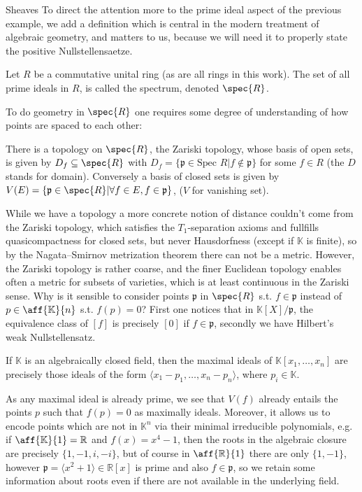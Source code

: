\begin{section}{Sheaves}
To direct the attention more to the prime ideal aspect of the previous example, 
we add a definition which is central in the modern treatment of algebraic geometry,
and matters to us, because we will need it to properly state the positive Nullstellensaetze.

\begin{definition}
   Let \( R \) be a commutative unital ring (as are all rings in this work).
   The set of all prime ideals in \( R \), is called the spectrum, denoted \( \spec{R} \).
\end{definition}

To do geometry in \( \spec{R} \) one requires some degree of understanding of how points are spaced to each other:
\begin{definition}
    There is a topology on \( \spec{R} \), the Zariski topology, whose basis of open sets,
    is given by \( D_f \subseteq \spec{R} \) with \( D_f = \{ \mathfrak{p} \in \text{Spec } R | f \notin \mathfrak{p} \} \) 
    for some \( f \in R \) (the \( D \) stands for domain). Conversely a basis of closed sets is given by
    \( V(E) = \{ \mathfrak{p} \in \spec{R} | \forall f \in E,  f \in \mathfrak{p} \} \), (\( V \) for vanishing set).
\end{definition}

While we have a topology a more concrete notion of distance couldn't come from the Zariski topology,
which satisfies the \( T_1 \)-separation axioms and fullfills quasicompactness for closed sets, but never Hausdorfness 
(except if \( \mathbb{K} \) is finite), 
so by the Nagata–Smirnov metrization theorem there can not be a metric. However, the Zariski topology is rather coarse,
and the finer Euclidean topology enables often a metric for subsets of varieties, which is at least continuous in the Zariski sense. 
Why is it sensible to consider points \( \mathfrak{p} \) in \( \spec{R} \) s.t. \( f \in \mathfrak{p} \) instead of
\( p \in \aff{\mathbb{K}}{n} \) s.t. \( f(p) = 0 \)? First one notices that in \( \mathbb{K}[X] / \mathfrak{p} \), 
the equivalence class of \( [f] \) is precisely \( [0] \) if \( f \in \mathfrak{p} \), secondly we have
Hilbert's weak Nullstellensatz.
\begin{theorem} \label{weakhilbertnull}
    If \( \mathbb{K} \) is an algebraically closed field, then the maximal ideals of \( \mathbb{K}[x_1, \dots, x_n] \)
    are precisely those ideals of the form \( \langle x_1 - p_1, \dots, x_n - p_n \rangle \), where \( p_i \in \mathbb{K} \).
\end{theorem}
As any maximal ideal is already prime, we see that \( V(f) \) already entails the points \( p \) such that \( f(p) = 0 \) as maximally ideals.
Moreover, it allows us to encode points which are not in \( \mathbb{K}^n \) via their minimal irreducible  polynomials, e.g.
if \( \aff{\mathbb{K}}{1} = \mathbb{R} \) and \( f(x) = x^4 - 1 \), then the roots in the algebraic closure are precisely \( \{1, -1, i, -i\} \),
but of course in \( \aff{\mathbb{R}}{1} \) there are only \( \{ 1, -1 \} \), however \( \mathfrak{p} = \langle x^2 + 1 \rangle \in \mathbb{R}[x] \) 
is prime and also \( f \in \mathfrak{p} \), so we retain some information about roots even if there are not available in the underlying field.



\end{section}
